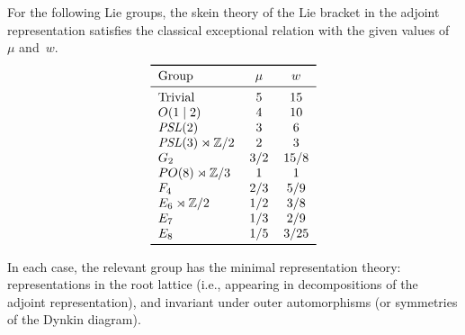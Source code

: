 \documentclass[12pt]{amsart}
\begin{document}
\begin{theorem}[Vogel]
  For the following Lie groups, the skein theory of the Lie bracket in
  the adjoint representation
  satisfies the classical exceptional relation with the given values
  of $\mu$ and~$w$.
  \[
  \begin{tabular}{lcc}
    \toprule
    Group         & $\mu$ & $w$\\
    \midrule
    Trivial             & $5$ & $15$ \\
    $O(1 \mid 2)$       & $4$ & $10$ \\
    $\PSL(2)$           & $3$ & $6$ \\
    $\PSL(3)\rtimes\ZZ/2$& $2$ & $3$ \\
    $G_2$              & $3/2$ & $15/8$ \\
    $PO(8)\rtimes\ZZ/3$  & $1$ & $1$\\
    $F_4$               & $2/3$ & $5/9$\\
    $E_6\rtimes\ZZ/2$   & $1/2$ & $3/8$\\
    $E_7$               & $1/3$ & $2/9$ \\
    $E_8$               & $1/5$ & $3/25$ \\
    \bottomrule
  \end{tabular}
  \]
\end{theorem}
In each case, the relevant group has the minimal representation
theory: representations in the root lattice (i.e., appearing in
decompositions of the adjoint representation), and invariant under
outer automorphisms (or symmetries of the Dynkin diagram).
\end{document}
